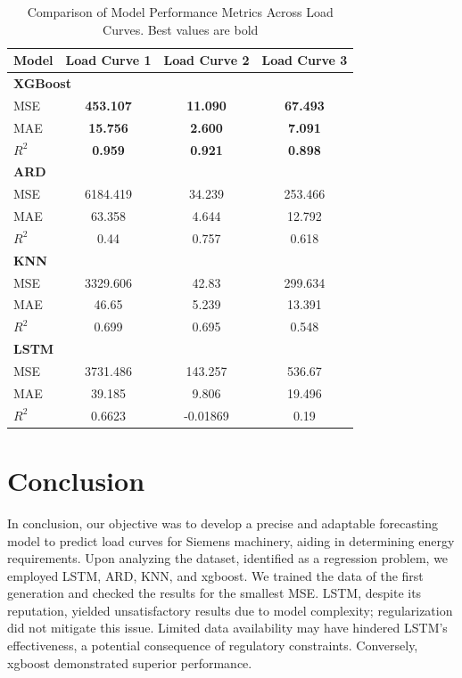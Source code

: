 \documentclass{article} %
\begin{document}
\begin{table}[H]
\centering
\caption{Comparison of Model Performance Metrics Across Load Curves. Best values are bold}
\label{tab:model_performance}
\begin{tabular}{@{\hspace{1em}}lccc}
\toprule
\textbf{Model} & \textbf{Load Curve 1} & \textbf{Load Curve 2} & \textbf{Load Curve 3} \\
\midrule
\multicolumn{4}{l}{\textbf{XGBoost}} \\
\midrule
MSE &\textbf{ 453.107} & \textbf{11.090} & \textbf{67.493} \\
MAE & \textbf{15.756} & \textbf{2.600} & \textbf{7.091} \\
$R^2$ & \textbf{0.959} & \textbf{0.921} &\textbf{ 0.898} \\
\midrule
\multicolumn{4}{l}{\textbf{ARD}} \\
\midrule
MSE & 6184.419 & 34.239 & 253.466 \\
MAE & 63.358 & 4.644 & 12.792 \\
$R^2$ & 0.44 & 0.757 & 0.618 \\
\midrule
\multicolumn{4}{l}{\textbf{KNN}} \\
\midrule
MSE & 3329.606 & 42.83 & 299.634 \\
MAE & 46.65 & 5.239 & 13.391 \\
$R^2$ & 0.699 & 0.695 & 0.548 \\
\midrule
\multicolumn{4}{l}{\textbf{LSTM}} \\
\midrule
MSE & 3731.486 & 143.257 & 536.67 \\
MAE & 39.185 & 9.806 & 19.496 \\
$R^2$ & 0.6623 & -0.01869 & 0.19 \\
\bottomrule
\end{tabular}
\end{table}


\section{Conclusion}
In conclusion, our objective was to develop a precise and adaptable forecasting model to predict load curves for Siemens machinery, aiding in determining energy requirements. Upon analyzing the dataset, identified as a regression problem, we employed \gls*{LSTM}, \gls*{ARD}, \gls*{KNN}, and \gls*{xgboost}. We trained the data of the first generation and checked the results for the smallest \gls*{MSE}. \gls*{LSTM}, despite its reputation, yielded unsatisfactory results due to model complexity; regularization did not mitigate this issue. Limited data availability may have hindered \gls*{LSTM}'s effectiveness, a potential consequence of regulatory constraints. Conversely, \gls*{xgboost} demonstrated superior performance. 
\end{document}
